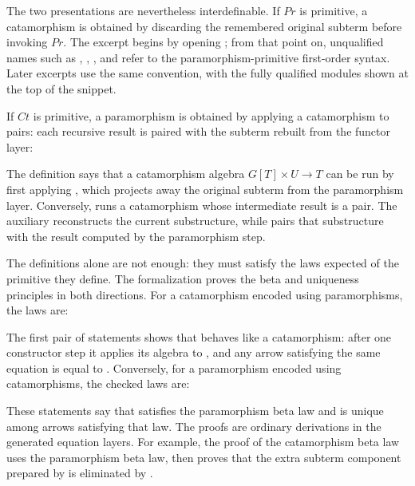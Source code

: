 \documentclass[sigplan,10pt,anonymous,review,screen]{acmart}
\begin{document}
The two presentations are nevertheless interdefinable.  If \(Pr\) is
primitive, a catamorphism is obtained by discarding the remembered original
subterm before invoking \(Pr\).  The excerpt begins by opening
; from that point on, unqualified names such as
, ,
, and  refer to the
paramorphism-primitive first-order syntax.  Later excerpts use the same
convention, with the fully qualified modules shown at the top of the
snippet.

{\small
\CorePRFOParamorphismCatamorphismDerivedP*
}

If \(Ct\) is primitive, a paramorphism is obtained by applying a catamorphism to pairs:
each recursive result is paired with the subterm rebuilt from the
functor layer:

{\small
\CorePRFOParamorphismCatamorphismDerivedCt*
}

The definition  says that a catamorphism algebra
\(G[T]\times U \to T\) can be run by first applying
, which projects away the original subterm
from the paramorphism layer.  Conversely,  runs a catamorphism
whose intermediate result is a pair.  The auxiliary
 reconstructs the current substructure, while
 pairs that substructure with the result computed
by the paramorphism step.

The definitions alone are not enough: they must satisfy the laws expected
of the primitive they define.  The formalization proves the beta and
uniqueness principles in both directions.  For a catamorphism encoded using
paramorphisms, the laws are:

{\small
\CorePRFOParamorphismCatamorphismLawsP*
}

The first pair of statements shows that  behaves like a
catamorphism: after one constructor step it applies its algebra to
, and any arrow satisfying the same equation is
equal to .  Conversely, for a paramorphism encoded using
catamorphisms, the checked laws are:

{\small
\CorePRFOParamorphismCatamorphismLawsCt*
}

These statements say that  satisfies the paramorphism
beta law and is unique among arrows satisfying that law.  The proofs are
ordinary derivations in the generated equation layers.  For example, the
proof of the catamorphism beta law uses the paramorphism beta law,
then proves that the extra subterm component prepared by
 is eliminated by .
\end{document}
